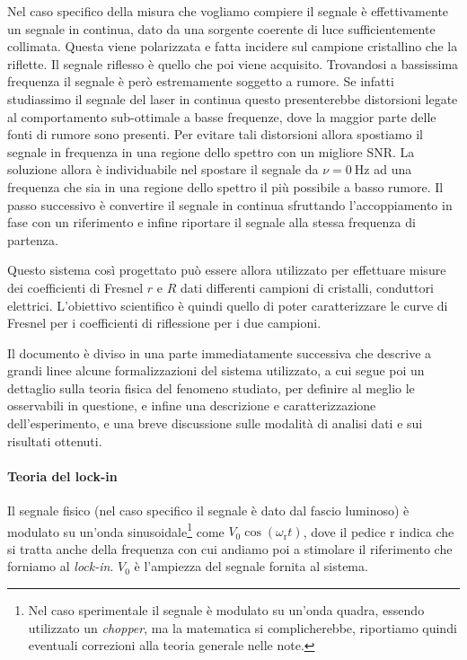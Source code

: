 \documentclass[
    prb,altaffilletter,citeautoscript,
    amsmath,amssymb,
    showpacs,showkeys,floatfix,
    reprint
]{revtex4-1}
\begin{document}
Nel caso specifico della misura che vogliamo compiere il segnale è effettivamente un segnale in continua, dato da una sorgente coerente di luce sufficientemente collimata. Questa viene polarizzata e fatta incidere sul campione cristallino che la riflette. Il segnale riflesso è quello che poi viene acquisito. Trovandosi a bassissima frequenza il segnale è però estremamente soggetto a rumore. Se infatti studiassimo il segnale del laser in continua questo presenterebbe distorsioni legate al comportamento sub-ottimale a basse frequenze, dove la maggior parte delle fonti di rumore sono presenti. Per evitare tali distorsioni allora spostiamo il segnale in frequenza in una regione dello spettro con un migliore SNR. La soluzione allora è individuabile nel spostare il segnale da $\nu=\SI{0}{\Hz}$ ad una frequenza che sia in una regione dello spettro il più possibile a basso rumore. Il passo successivo è convertire il segnale in continua sfruttando l'accoppiamento in fase con un riferimento e infine riportare il segnale alla stessa frequenza di partenza. 

Questo sistema così progettato può essere allora utilizzato per effettuare misure dei coefficienti di Fresnel\cite{fresnelCalculationTintsThat2021,fresnelNoteCalculTeintes1821} $r$ e $R$ dati differenti campioni di cristalli, conduttori elettrici. L'obiettivo scientifico è quindi quello di poter caratterizzare le curve di Fresnel per i coefficienti di riflessione per i due campioni. 

Il documento è diviso in una parte immediatamente successiva che descrive a grandi linee alcune formalizzazioni del sistema utilizzato, a cui segue poi un dettaglio sulla teoria fisica del fenomeno studiato, per definire al meglio le osservabili in questione, e infine una descrizione e caratterizzazione dell'esperimento, e una breve discussione sulle modalità di analisi dati e sui risultati ottenuti. 

\paragraph*{Teoria del lock-in} 
Il segnale fisico (nel caso specifico il segnale è dato dal fascio luminoso) è modulato su un'onda sinusoidale\footnote{Nel caso sperimentale il segnale è modulato su un'onda quadra, essendo utilizzato un \emph{chopper}, ma la matematica si complicherebbe, riportiamo quindi eventuali correzioni alla teoria generale nelle note.} come $V_0 \cos(\omega_\mathrm{r} t)$, dove il pedice r indica che si tratta anche della frequenza con cui andiamo poi a stimolare il riferimento che forniamo al \emph{lock-in}. $V_0$ è l'ampiezza del segnale fornita al sistema. 
\end{document}

